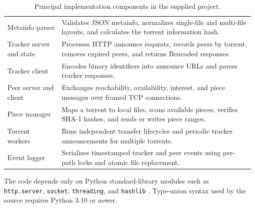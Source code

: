 \begin{table}[H]
  \centering
  \caption{Principal implementation components in the supplied project.}
  \label{tab:components}
  \begin{tabularx}{\textwidth}{@{}p{}Y@{}}
    \toprule
     &  \\
    \midrule
    Metainfo parser & Validates JSON metainfo, normalizes single-file and multi-file layouts, and calculates the torrent information hash. \\
    Tracker server and state & Processes HTTP announce requests, records peers by torrent, removes expired peers, and returns Bencoded responses. \\
    Tracker client & Encodes binary identifiers into announce URLs and parses tracker responses. \\
    Peer server and client & Exchanges reachability, availability, interest, and piece messages over framed TCP connections. \\
    Piece manager & Maps a torrent to local files, scans available pieces, verifies SHA-1 hashes, and reads or writes piece ranges. \\
    Torrent workers & Runs independent transfer lifecycles and periodic tracker announcements for multiple torrents. \\
    Event logger & Serializes timestamped tracker and peer events using per-path locks and atomic file replacement. \\
    \bottomrule
  \end{tabularx}
\end{table}

The code depends only on Python standard-library modules such as \texttt{http.server}, \texttt{socket}, \texttt{threading}, and \texttt{hashlib} \citep{pythonStdlib}. Type-union syntax used by the source requires Python 3.10 or newer.
